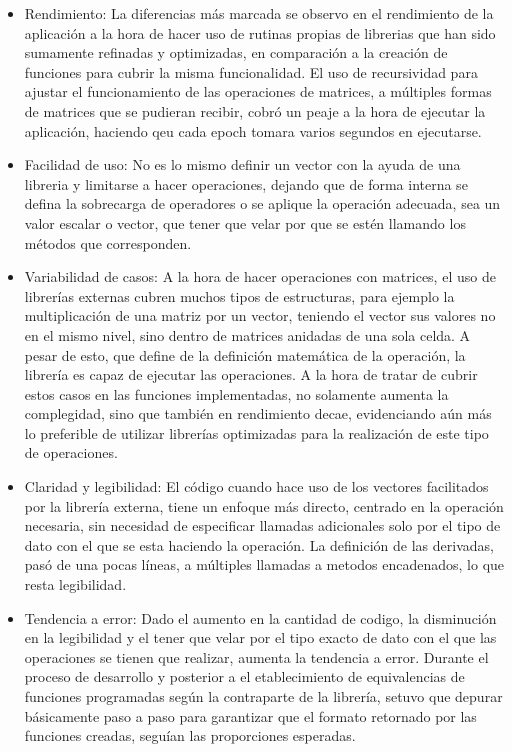 \documentclass[12pt]{article}
\begin{document}
\begin{itemize}
    \item Rendimiento: La diferencias más marcada se observo en el rendimiento de la aplicación a la hora de hacer uso de rutinas propias de librerias que han sido sumamente refinadas y optimizadas, en comparación a la creación de funciones para cubrir la misma funcionalidad. El uso de recursividad para ajustar el funcionamiento de las operaciones de matrices, a múltiples formas de matrices que se pudieran recibir, cobró un peaje a la hora de ejecutar la aplicación, haciendo qeu cada epoch tomara varios segundos en ejecutarse.
    \item Facilidad de uso: No es lo mismo definir un vector con la ayuda de una libreria y limitarse a hacer operaciones, dejando que de forma interna se defina la sobrecarga de operadores o se aplique la operación adecuada, sea un valor escalar o vector, que tener que velar por que se estén llamando los métodos que corresponden.
    \item Variabilidad de casos: A la hora de hacer operaciones con matrices, el uso de librerías externas cubren muchos tipos de estructuras, para ejemplo la multiplicación de una matriz por un vector, teniendo el vector sus valores no en el mismo nivel, sino dentro de matrices anidadas de una sola celda. A pesar de esto, que define de la definición matemática de la operación, la librería es capaz de ejecutar las operaciones. A la hora de tratar de cubrir estos casos en las funciones implementadas, no solamente aumenta la complegidad, sino que también en rendimiento decae, evidenciando aún más lo preferible de utilizar librerías optimizadas para la realización de este tipo de operaciones.
    \item Claridad y legibilidad: El código cuando hace uso de los vectores facilitados por la librería externa, tiene un enfoque más directo, centrado en la operación necesaria, sin necesidad de especificar llamadas adicionales solo por el tipo de dato con el que se esta haciendo la operación. La definición de las derivadas, pasó de una pocas líneas, a múltiples llamadas a metodos encadenados, lo que resta legibilidad.
    \item Tendencia a error: Dado el aumento en la cantidad de codigo, la disminución en la legibilidad y el tener que velar por el tipo exacto de dato con el que las operaciones se tienen que realizar, aumenta la tendencia a error. Durante el proceso de desarrollo y posterior a el etablecimiento de equivalencias de funciones programadas según la contraparte de la librería, setuvo que depurar básicamente paso a paso para garantizar que el formato retornado por las funciones creadas, seguían las proporciones esperadas.

\end{itemize}
\end{document}
